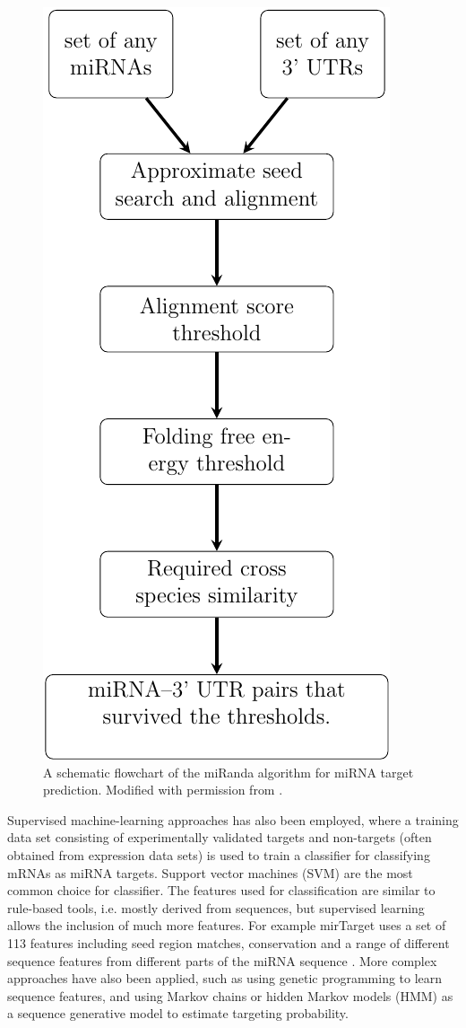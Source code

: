\begin{figure}[htb]
  \centering
  \includegraphics[width=0.3\linewidth]{figures/miRanda-flow.pdf}
  \caption{A schematic flowchart of the miRanda \citep{Betel2008} algorithm for
  miRNA target prediction. Modified with permission from \citep{Karhu2009}.}
  \label{fig:miranda-flow}
\end{figure}



Supervised machine-learning approaches has also been employed, where a
training data set consisting of experimentally validated targets and non-targets
(often obtained from expression data sets) is used to train a
classifier for classifying mRNAs as miRNA targets. Support vector machines (SVM)
are the most common choice for classifier. The features used for classification
are similar to rule-based tools, i.e. mostly derived from sequences, but supervised
learning allows the inclusion of much more features. For example mirTarget
uses a set of 113 features including seed region matches, conservation and a
range of different sequence features from different parts of the miRNA
sequence \citep{Wang2008}. More complex approaches have also been applied,
such as using genetic programming to learn sequence features, and using
Markov chains or hidden Markov models (HMM) as a sequence
generative model to estimate targeting probability.


